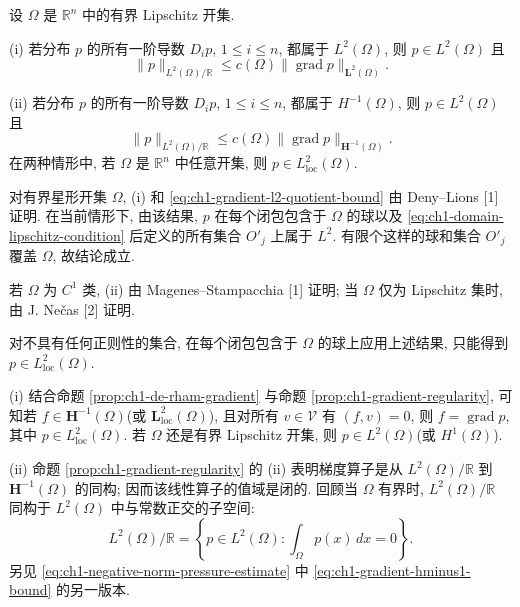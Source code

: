 \begin{Proposition}
\label{prop:ch1-gradient-regularity}
设 $\Omega$ 是 $\mathbb R^n$ 中的有界 Lipschitz 开集.

(i) 若分布 $p$ 的所有一阶导数 $D_i p$, $1\leq i\leq n$, 都属于 $L^2(\Omega)$, 则 $p\in L^2(\Omega)$ 且
\begin{equation}
\lVert p\rVert_{L^2(\Omega)/\mathbb R}
\leq c(\Omega)\lVert\operatorname{grad}p\rVert_{\mathbf L^2(\Omega)}.
\label{eq:ch1-gradient-l2-quotient-bound}
\end{equation}

(ii) 若分布 $p$ 的所有一阶导数 $D_i p$, $1\leq i\leq n$, 都属于 $H^{-1}(\Omega)$, 则 $p\in L^2(\Omega)$ 且
\begin{equation}
\lVert p\rVert_{L^2(\Omega)/\mathbb R}
\leq c(\Omega)\lVert\operatorname{grad}p\rVert_{\mathbf H^{-1}(\Omega)}.
\label{eq:ch1-gradient-hminus1-bound}
\end{equation}
在两种情形中, 若 $\Omega$ 是 $\mathbb R^n$ 中任意开集, 则 $p\in L^2_{\mathrm{loc}}(\Omega)$.
\end{Proposition}

\begin{Proof}
对有界星形开集 $\Omega$, (i) 和 \eqref{eq:ch1-gradient-l2-quotient-bound} 由 Deny--Lions [1] 证明. 在当前情形下, 由该结果, $p$ 在每个闭包包含于 $\Omega$ 的球以及 \eqref{eq:ch1-domain-lipschitz-condition} 后定义的所有集合 $O'_j$ 上属于 $L^2$. 有限个这样的球和集合 $O'_j$ 覆盖 $\Omega$, 故结论成立.

若 $\Omega$ 为 $C^1$ 类, (ii) 由 Magenes--Stampacchia [1] 证明; 当 $\Omega$ 仅为 Lipschitz 集时, 由 J. Nečas [2] 证明.

对不具有任何正则性的集合, 在每个闭包包含于 $\Omega$ 的球上应用上述结果, 只能得到 $p\in L^2_{\mathrm{loc}}(\Omega)$.
\end{Proof}

\begin{Remark}
\label{rem:ch1-gradient-operator-range}
(i) 结合命题 \ref{prop:ch1-de-rham-gradient} 与命题 \ref{prop:ch1-gradient-regularity}, 可知若 $f\in\mathbf H^{-1}(\Omega)$(或 $\mathbf L^2_{\mathrm{loc}}(\Omega)$), 且对所有 $v\in\mathcal V$ 有 $(f,v)=0$, 则 $f=\operatorname{grad}p$, 其中 $p\in L^2_{\mathrm{loc}}(\Omega)$. 若 $\Omega$ 还是有界 Lipschitz 开集, 则 $p\in L^2(\Omega)$(或 $H^1(\Omega)$).

(ii) 命题 \ref{prop:ch1-gradient-regularity} 的 (ii) 表明梯度算子是从 $L^2(\Omega)/\mathbb R$ 到 $\mathbf H^{-1}(\Omega)$ 的同构; 因而该线性算子的值域是闭的. 回顾当 $\Omega$ 有界时, $L^2(\Omega)/\mathbb R$ 同构于 $L^2(\Omega)$ 中与常数正交的子空间:
\[
L^2(\Omega)/\mathbb R
=\left\{p\in L^2(\Omega):\int_\Omega p(x)\,dx=0\right\}.
\]
另见 \eqref{eq:ch1-negative-norm-pressure-estimate} 中 \eqref{eq:ch1-gradient-hminus1-bound} 的另一版本.
\end{Remark}

